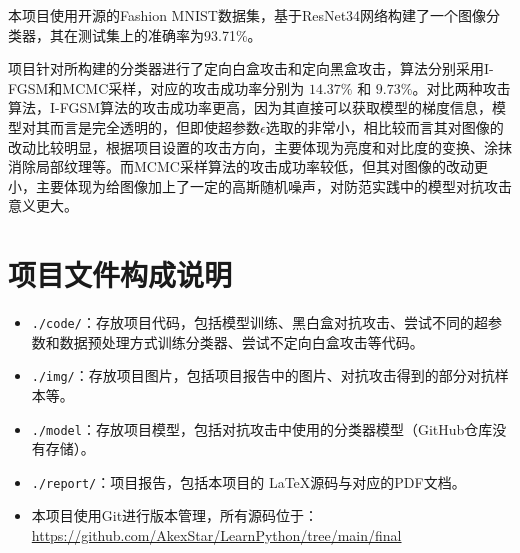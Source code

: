 \documentclass[journal, a4paper]{IEEEtran}
\begin{document}
本项目使用开源的Fashion MNIST数据集，基于ResNet34网络构建了一个图像分类器，其在测试集上的准确率为93.71\%。

项目针对所构建的分类器进行了定向白盒攻击和定向黑盒攻击，算法分别采用I-FGSM和MCMC采样，对应的攻击成功率分别为 $14.37\%$ 和 $9.73\%$。对比两种攻击算法，I-FGSM算法的攻击成功率更高，因为其直接可以获取模型的梯度信息，模型对其而言是完全透明的，但即使超参数$\epsilon$选取的非常小，相比较而言其对图像的改动比较明显，根据项目设置的攻击方向，主要体现为亮度和对比度的变换、涂抹消除局部纹理等。而MCMC采样算法的攻击成功率较低，但其对图像的改动更小，主要体现为给图像加上了一定的高斯随机噪声，对防范实践中的模型对抗攻击意义更大。

\section*{\textbf{项目文件构成说明}}

\begin{itemize}
    \item \verb|./code/|：存放项目代码，包括模型训练、黑白盒对抗攻击、尝试不同的超参数和数据预处理方式训练分类器、尝试不定向白盒攻击等代码。
    \item \verb|./img/|：存放项目图片，包括项目报告中的图片、对抗攻击得到的部分对抗样本等。
    \item \verb|./model|：存放项目模型，包括对抗攻击中使用的分类器模型（GitHub仓库没有存储）。
    \item \verb|./report/|：项目报告，包括本项目的 \LaTeX 源码与对应的PDF文档。
    \item 本项目使用Git进行版本管理，所有源码位于：\url{https://github.com/AkexStar/LearnPython/tree/main/final}
    
\end{itemize}
\end{document}
